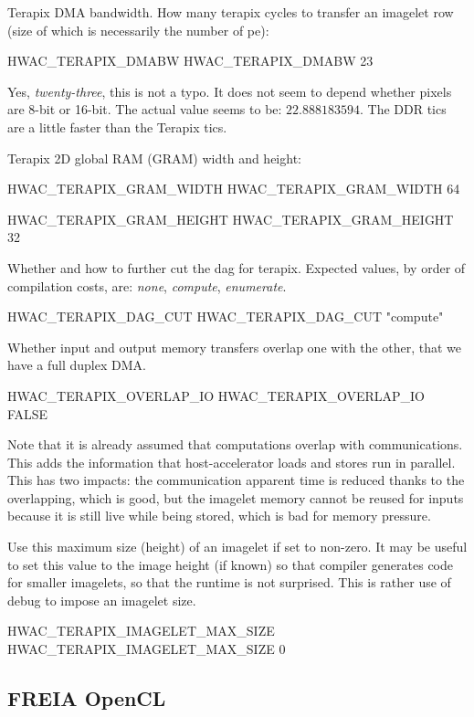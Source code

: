 \documentclass[a4paper]{report}
\begin{document}
Terapix DMA bandwidth. How many terapix cycles to transfer an imagelet row
(size of which is necessarily the number of pe):
\begin{PipsProp}{HWAC_TERAPIX_DMABW}
HWAC_TERAPIX_DMABW 23
\end{PipsProp}
Yes, \emph{twenty-three}, this is not a typo.
It does not seem to depend whether pixels are 8-bit or 16-bit.
The actual value seems to be: $22.888183594$.
The DDR tics are a little faster than the Terapix tics.

Terapix 2D global RAM (GRAM) width and height:
\begin{PipsProp}{HWAC_TERAPIX_GRAM_WIDTH}
HWAC_TERAPIX_GRAM_WIDTH 64
\end{PipsProp}
\begin{PipsProp}{HWAC_TERAPIX_GRAM_HEIGHT}
HWAC_TERAPIX_GRAM_HEIGHT 32
\end{PipsProp}

Whether and how to further cut the dag for terapix.
Expected values, by order of compilation costs, are:
\emph{none}, \emph{compute}, \emph{enumerate}.
\begin{PipsProp}{HWAC_TERAPIX_DAG_CUT}
HWAC_TERAPIX_DAG_CUT "compute"
\end{PipsProp}

Whether input and output memory transfers overlap one with the other,
that we have a full duplex DMA.
\begin{PipsProp}{HWAC_TERAPIX_OVERLAP_IO}
HWAC_TERAPIX_OVERLAP_IO FALSE
\end{PipsProp}
Note that it is already assumed that computations overlap with
communications. This adds the information that host-accelerator
loads and stores run in parallel. This has two impacts: the
communication apparent time is reduced thanks to the overlapping,
which is good, but the imagelet memory cannot be reused for inputs
because it is still live while being stored, which is bad for
memory pressure.

Use this maximum size (height) of an imagelet if set to non-zero.
It may be useful to set this value to the image height (if known) so
that compiler generates code for smaller imagelets, so that the
runtime is not surprised. This is rather use of debug to impose
an imagelet size.
\begin{PipsProp}{HWAC_TERAPIX_IMAGELET_MAX_SIZE}
HWAC_TERAPIX_IMAGELET_MAX_SIZE 0
\end{PipsProp}

\subsection{FREIA OpenCL}
\label{hwac-freia-opencl}
\end{document}
